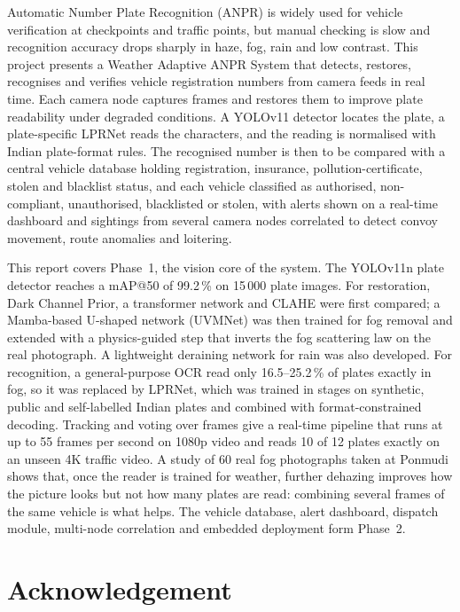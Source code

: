 Automatic Number Plate Recognition (ANPR) is widely used for vehicle
verification at checkpoints and traffic points, but manual checking is slow
and recognition accuracy drops sharply in haze, fog, rain and low contrast.
This project presents a Weather Adaptive ANPR System that detects,
restores, recognises and verifies vehicle registration numbers from camera
feeds in real time. Each camera node captures frames and restores them to
improve plate readability under degraded conditions. A YOLOv11 detector
locates the plate, a plate-specific LPRNet reads the characters, and the
reading is normalised with Indian plate-format rules. The recognised number is
then to be compared with a central vehicle database holding registration,
insurance, pollution-certificate, stolen and blacklist status, and each vehicle
classified as authorised, non-compliant, unauthorised, blacklisted or stolen,
with alerts shown on a real-time dashboard and sightings from several camera
nodes correlated to detect convoy movement, route anomalies and loitering.

This report covers Phase~1, the vision core of the system. The YOLOv11n
plate detector reaches a mAP@50 of 99.2\,\% on 15\,000 plate images. For
restoration, Dark Channel Prior, a transformer network and CLAHE were first
compared; a Mamba-based U-shaped network (UVMNet) was then trained for fog
removal and extended with a physics-guided step that inverts the fog
scattering law on the real photograph. A lightweight deraining network
for rain was also developed. For recognition, a general-purpose OCR read only
16.5--25.2\,\% of plates exactly in fog, so it was replaced by LPRNet, which was
trained in stages on synthetic, public and self-labelled Indian plates and
combined with format-constrained decoding. Tracking and voting over frames
give a real-time pipeline that runs at up to 55 frames per second on 1080p
video and reads 10 of 12 plates exactly on an unseen 4K traffic video.
A study of 60 real fog photographs taken at Ponmudi shows that, once the
reader is trained for weather, further dehazing improves how the picture looks
but not how many plates are read: combining several frames of the same vehicle
is what helps. The vehicle database, alert dashboard, dispatch module,
multi-node correlation and embedded deployment form Phase~2.

\clearpage
\chapter*{Acknowledgement}

